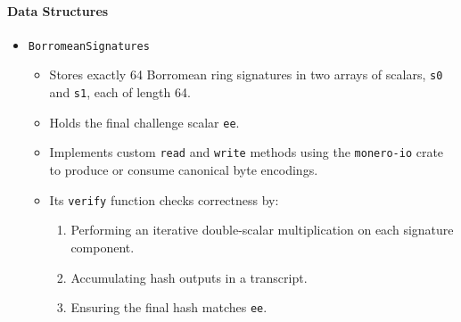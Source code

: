 \documentclass[12pt,a4paper]{article}
\begin{document}
\paragraph{Data Structures}
\begin{itemize}
  \item \texttt{BorromeanSignatures}
  \begin{itemize}
    \item Stores exactly 64 Borromean ring signatures in two arrays of scalars, \texttt{s0} and \texttt{s1}, each of length 64.
    \item Holds the final challenge scalar \texttt{ee}.
    \item Implements custom \texttt{read} and \texttt{write} methods using the \texttt{monero-io} crate to produce or consume canonical byte encodings. %
    \item Its \texttt{verify} function checks correctness by: %
      \begin{enumerate}[label=(\alph*)]
        \item Performing an iterative double-scalar multiplication on each signature component. %
        \item Accumulating hash outputs in a transcript. %
        \item Ensuring the final hash matches \texttt{ee}. %
      \end{enumerate}
  \end{itemize}


\end{itemize}
\end{document}
